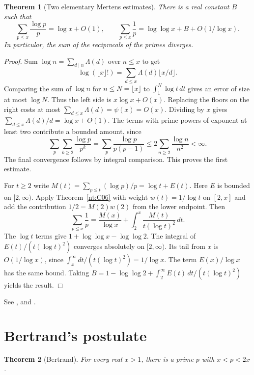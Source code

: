 \documentclass[11pt,oneside,openany]{book}
\theoremstyle{plain}
\newtheorem{theorem}{Theorem}[chapter]
\theoremstyle{definition}
\theoremstyle{remark}
\begin{document}
\begin{theorem}[Two elementary Mertens estimates]\label{nt:C09}
There is a real constant \(B\) such that
\[
 \sum_{p\le x}\frac{\log p}{p}=\log x+O(1),
 \qquad
 \sum_{p\le x}\frac1p=\log\log x+B+O(1/\log x).
\]
In particular, the sum of the reciprocals of the primes diverges.
\end{theorem}

\begin{proof}
Sum \(\log n=\sum_{d\mid n}\Lambda(d)\) over \(n\le x\) to get
\[
 \log(\lfloor x\rfloor!)=\sum_{d\le x}\Lambda(d)\lfloor x/d\rfloor.
\]
Comparing the sum of \(\log n\) for \(n\le N=\lfloor x\rfloor\) to
\(\int_1^N\log t\,dt\) gives an error of size at most \(\log N\).
Thus the left side is \(x\log x+O(x)\). Replacing the floors on
the right costs at most
\(\sum_{d\le x}\Lambda(d)=\psi(x)=O(x)\). Dividing by \(x\) gives
\(\sum_{d\le x}\Lambda(d)/d=\log x+O(1)\).
The terms with prime powers of exponent at least two contribute a
bounded amount, since
\[
 \sum_p\sum_{k\ge2}\frac{\log p}{p^k}
 =\sum_p\frac{\log p}{p(p-1)}
 \le 2\sum_{n\ge2}\frac{\log n}{n^2}<\infty.
\]
The final convergence follows by integral comparison.
This proves the first estimate.

For \(t\ge2\) write \(M(t)=\sum_{p\le t}(\log p)/p=\log t+E(t)\).
Here \(E\) is bounded on \([2,\infty)\). Apply Theorem~\ref{nt:C06}
with weight \(w(t)=1/\log t\) on \([2,x]\) and add the contribution
\(1/2=M(2)w(2)\) from the lower endpoint. Then
\[
 \sum_{p\le x}\frac1p
 =\frac{M(x)}{\log x}+\int_2^x\frac{M(t)}{t(\log t)^2}\,dt.
\]
The \(\log t\) terms give \(1+\log\log x-\log\log2\). The integral
of \(E(t)/(t(\log t)^2)\) converges absolutely on \([2,\infty)\).
Its tail from \(x\) is \(O(1/\log x)\), since
\(\int_x^\infty dt/(t(\log t)^2)=1/\log x\). The term
\(E(x)/\log x\) has the same bound. Taking
\(B=1-\log\log2+\int_2^\infty E(t)\,dt/(t(\log t)^2)\)
yields the result.
\end{proof}

See \cite[Section 8.1, Theorems 8.3--8.5, Corollary 8.6 and
Theorem 8.8]{nzm}, and
\cite[Sections 3.11, 4.2 and 4.8]{apostol}.

\section{Bertrand's postulate}

\begin{theorem}[Bertrand]\label{nt:C10}
For every real \(x>1\), there is a prime \(p\) with \(x<p<2x\).
\end{theorem}
\end{document}

